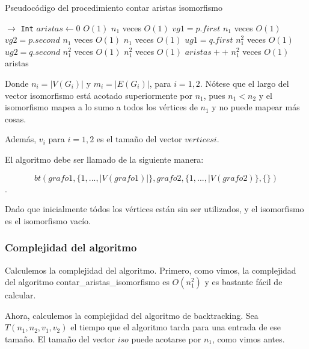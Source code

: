 \begin{algorithm}[H]
  \begin{algorithmic}[1]
  \caption{Pseudocódigo del procedimiento contar aristas isomorfismo}
  \label{algo:2-2}
     $\to$ \texttt{Int}
      \State $aristas \gets 0$
      \Comment $O(1)$
         \Comment $n_1$ veces $O(1)$ 
         \State $vg1 = p.first$
         \Comment $n_1$ veces $O(1)$ 
         \State $vg2 = p.second$
         \Comment $n_1$ veces $O(1)$ 
           \Comment $n_1$ veces $O(1)$
           \State $ug1 = q.first$
           \Comment $n_1^2$ veces $O(1)$
           \State $ug2 = q.second$
           \Comment $n_1^2$ veces $O(1)$
           \Comment $n_1^2$ veces $O(1)$
             \State $aristas++$
             \Comment $n_1^2$ veces $O(1)$
           \EndIf
         \EndFor
       \EndFor
     \Return aristas
		\EndProcedure
	\end{algorithmic}
\end{algorithm}

Donde $n_i = |V(G_i)|$ y $m_i = |E(G_i)|$, para $i = 1, 2$. Nótese que el largo del vector isomorfismo está acotado superiormente por $n_1$, pues $n_1 < n_2$ y el isomorfismo mapea a lo sumo a todos los vértices de $n_1$ y no puede mapear más cosas. 

Además, $v_i$ para $i = 1,2$ es el tamaño del vector $verticesi$.


El algoritmo debe ser llamado de la siguiente manera:

\[bt(grafo1, \{1,...,|V(grafo1)|\}, grafo2, \{1,...,|V(grafo2)\}, \{ \})\].

Dado que inicialmente tódos los vértices están sin ser utilizados, y el isomorfismo es el isomorfismo vacío.

\subsubsection{Complejidad del algoritmo}

Calculemos la complejidad del algoritmo. Primero, como vimos, la complejidad del algoritmo contar\_aristas\_isomorfismo es $O(n_1^2)$ y es bastante fácil de calcular.

Ahora, calculemos la complejidad del algoritmo de backtracking. Sea $T(n_1, n_2, v_1, v_2)$ el tiempo que el algoritmo tarda para una entrada de ese tamaño. El tamaño del vector $iso$ puede acotarse por $n_1$, como vimos antes.

